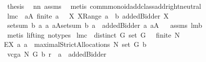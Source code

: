 \begin{isabellebody}
\isamarkupfalse%
\ {\isacharquery}thesis\ \isamarkupfalse%
\ nn{}{}\ assms{\isacharparenleft}{}{\isacharparenright}\ \isamarkupfalse%
\ {\isacharparenleft}metis\ comm{\isacharunderscore}monoid{\isacharunderscore}add{\isacharunderscore}class{\isachardot}add{\isachardot}right{\isacharunderscore}neutral{\isacharparenright}\isanewline
{}\isamarkupfalse%
%
\endisatagproof
{\isafoldproof}%
%
\isadelimproof
\isanewline
%
\endisadelimproof
\isanewline
{}\isamarkupfalse%
\ lm{}{}c{\isacharcolon}\ \ {\isachardoublequoteopen}{\isasymforall}a{\isasymin}A{\isachardot}\ finite\ a\ {\isacharampersand}\ {\isacharparenleft}{\isasymforall}\ X{\isachardot}\ X{\isasymin}Range\ a\ {\isasymlongrightarrow}\ b\ {\isacharparenleft}addedBidder{\isacharprime}{\isacharcomma}\ X{\isacharparenright}{\isacharequal}{}{\isacharparenright}{\isachardoublequoteclose}\isanewline
{}\ {\isachardoublequoteopen}{\isacharbraceleft}setsum\ b\ a{\isacharbar}\ a{\isachardot}\ a{\isasymin}A{\isacharbraceright}{\isacharequal}{\isacharbraceleft}setsum\ b\ {\isacharparenleft}a\ {\isacharminus}{\isacharminus}\ addedBidder{\isacharprime}{\isacharparenright}{\isacharbar}\ a{\isachardot}\ a{\isasymin}A{\isacharbraceright}{\isachardoublequoteclose}%
\isadelimproof
\ %
\endisadelimproof
%
\isatagproof
{}\isamarkupfalse%
\ assms\ lm{}{}b\ \isanewline
{}\isamarkupfalse%
\ {\isacharparenleft}metis\ {\isacharparenleft}lifting{\isacharcomma}\ no{\isacharunderscore}types{\isacharparenright}{\isacharparenright}%
\endisatagproof
{\isafoldproof}%
%
\isadelimproof
%
\endisadelimproof
\isanewline
{}\isamarkupfalse%
\ lm{}{}c{\isacharcolon}\ \ {\isachardoublequoteopen}distinct\ G{\isachardoublequoteclose}\ {\isachardoublequoteopen}set\ G\ {\isasymnoteq}\ {\isacharbraceleft}{\isacharbraceright}{\isachardoublequoteclose}\ {\isachardoublequoteopen}finite\ N{\isachardoublequoteclose}\ \isanewline
{\isachardoublequoteopen}EX\ a{\isachardot}\ {\isacharparenleft}{\isacharparenleft}a\ {\isasymin}\ {\isacharparenleft}maximalStrictAllocations{\isacharprime}\ N\ {\isacharparenleft}set\ G{\isacharparenright}\ b{\isacharparenright}{\isacharparenright}\ \isanewline
{\isacharampersand}\ {\isacharparenleft}vcga{\isacharprime}\ N\ G\ b\ r\ {\isacharequal}\ a\ {\isacharminus}{\isacharminus}\ addedBidder{\isacharprime}{\isacharparenright}\ \isanewline

\end{isabellebody}
